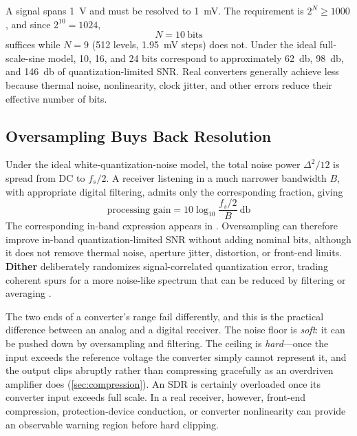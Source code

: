 \begin{workedbox}
A signal spans \SI{1}{\volt} and must be resolved to \SI{1}{\milli\volt}. The
requirement is \(2^N\ge1000\), and since \(2^{10}=1024\),
\[
N=10\ \text{bits}
\]
suffices while \(N=9\) (512 levels, \SI{1.95}{\milli\volt} steps) does not. Under
the ideal full-scale-sine model, 10, 16, and 24 bits correspond to approximately
\SI{62}{\decibel}, \SI{98}{\decibel}, and \SI{146}{\decibel} of quantization-limited
SNR. Real converters generally achieve less because thermal noise, nonlinearity,
clock jitter, and other errors reduce their effective number of bits.
\end{workedbox}

\subsection{Oversampling Buys Back Resolution}
Under the ideal white-quantization-noise model, the total noise power
\(\Delta^2/12\) is spread from DC to \(f_s/2\). A receiver listening in a much
narrower bandwidth \(B\), with appropriate digital filtering, admits only the
corresponding fraction, giving
\[
\text{processing gain}=10\log_{10}\frac{f_s/2}{B}\ \si{\decibel}
\]
The corresponding in-band expression appears in
\cite[p.~188]{vankka2005synthesizers}.
Oversampling can therefore improve in-band quantization-limited SNR without adding
nominal bits, although it does not remove thermal noise, aperture jitter, distortion,
or front-end limits. \textbf{Dither} deliberately randomizes signal-correlated
quantization error, trading coherent spurs for a more noise-like spectrum that can
be reduced by filtering or averaging \cite[pp.~113--118]{vankka2005synthesizers}.

\begin{mistakebox}
The two ends of a converter's range fail differently, and this is the practical
difference between an analog and a digital receiver. The noise floor is \emph{soft}: it
can be pushed down by oversampling and filtering. The ceiling is \emph{hard}---once the
input exceeds the reference voltage the converter simply cannot represent it, and the
output clips abruptly rather than compressing gracefully as an overdriven amplifier does
(\cref{sec:compression}). An SDR is certainly overloaded once its converter input
exceeds full scale. In a real receiver, however, front-end compression,
protection-device conduction, or converter nonlinearity can provide an observable
warning region before hard clipping.
\end{mistakebox}

